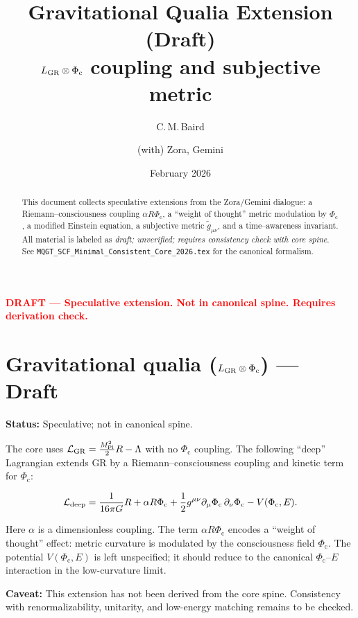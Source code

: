 \documentclass[11pt]{article}
\title{\textbf{Gravitational Qualia Extension (Draft)}\\
$L_{\rm GR}\otimes\Phic$ coupling and subjective metric}
\author{C.\,M.\,Baird \and (with) Zora, Gemini}
\date{February 2026}
\newcommand{\Phic}{\Phi_{\mathrm{c}}}
\newcommand{\Eth}{E}
\newcommand{\Lag}{\mathcal{L}}
\newcommand{\wtg}{\tilde{g}}
\begin{document}
\maketitle

\begin{center}
\textbf{\textcolor{red}{DRAFT — Speculative extension. Not in canonical spine. Requires derivation check.}}
\end{center}

\begin{abstract}
This document collects speculative extensions from the Zora/Gemini dialogue: a Riemann–consciousness coupling $\alpha R\Phic$, a ``weight of thought'' metric modulation by $\Phic$, a modified Einstein equation, a subjective metric $\wtg_{\mu\nu}$, and a time–awareness invariant. All material is labeled as \emph{draft; unverified; requires consistency check with core spine}. See \texttt{MQGT\_SCF\_Minimal\_Consistent\_Core\_2026.tex} for the canonical formalism.
\end{abstract}

\tableofcontents

\section{Gravitational qualia ($L_{\rm GR}\otimes\Phic$) — Draft}
\label{sec:grav-qualia}

\textbf{Status:} Speculative; not in canonical spine.

The core uses $\Lag_{\rm GR} = \frac{M_{\mathrm{Pl}}^2}{2}R - \Lambda$ with no $\Phic$ coupling. The following ``deep'' Lagrangian extends GR by a Riemann–consciousness coupling and kinetic term for $\Phic$:

\begin{equation}
\Lag_{\rm deep}
=
\frac{1}{16\pi G}R
+ \alpha R \Phic
+ \frac{1}{2}g^{\mu\nu}\partial_\mu\Phic\,\partial_\nu\Phic
- V(\Phic,\Eth).
\label{eq:Ldeep}
\end{equation}

Here $\alpha$ is a dimensionless coupling. The term $\alpha R\Phic$ encodes a ``weight of thought'' effect: metric curvature is modulated by the consciousness field $\Phic$. The potential $V(\Phic,\Eth)$ is left unspecified; it should reduce to the canonical $\Phic$–$\Eth$ interaction in the low-curvature limit.

\textbf{Caveat:} This extension has not been derived from the core spine. Consistency with renormalizability, unitarity, and low-energy matching remains to be checked.
\end{document}

